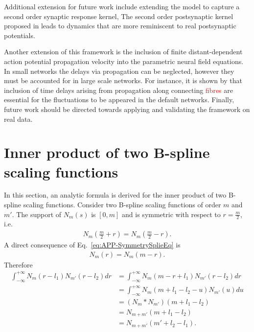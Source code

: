 \documentclass[review,authoryear,3p]{elsarticle}
\newcommand{\parham}[1]{\textcolor{red}{#1}}
\begin{document}
Additional extension for future work include extending the model to capture a second order synaptic response kernel, The second order postsynaptic kernel proposed in \citet{VanRotterdam1982} leads to dynamics that are more reminiscent to real postsynaptic potentials. 

Another extension of this framework is the inclusion of finite distant-dependent action potential propagation velocity into the parametric neural field equations. In small networks the delays via propagation can be neglected, however they must be accounted for in large scale networks. For instance, it is shown by \citet{Ghosh2008} that inclusion of time delays arising from propagation along connecting \parham{fibres} are essential for the fluctuations to be appeared in the default networks. Finally, future work should be directed towards applying and validating the framework on real data.

\appendix
\section{Inner product of two B-spline scaling functions}\label{ap:InnerProductOfBsplines}
In this section, an analytic formula is derived for the inner product of two B-spline scaling functions. Consider two B-spline scaling functions of order $m$ and $m'$. The support of $N_m\left(s\right)$ is $\left[ 0,m\right]$ and  is symmetric with respect to $r=\frac{m}{2}$, i.e.
\begin{align}\label{eq:APP-SymmetrySplieEq}
 N_{m}\left(\frac{m}{2}+r\right)=N_{m}\left(\frac{m}{2}-r\right).
\end{align}
A direct consequence of Eq.~\eqref{eq:APP-SymmetrySplieEq} is 
\begin{align}
 N_{m}\left(r\right)=N_{m}\left(m-r\right).
\end{align}
Therefore
\begin{align}
\int_{-\infty}^{+\infty}N_{m}\left(r-l_{1}\right)N_{m'}\left(r-l_{2}\right)dr&=\int_{-\infty}^{+\infty}N_{m}\left(m-r+l_{1}\right)N_{m'}\left(r-l_{2}\right)dr \nonumber \\
&=\int_{-\infty}^{+\infty}N_{m}\left(m+l_{1}-l_{2}-u\right)N_{m'}\left(u\right)du \nonumber \\
&=\left(N_m \ast N_{m'}\right) \left(m+l_{1}-l_{2}\right) \nonumber \\
&=N_{m+m'}\left(m+l_{1}-l_{2}\right) \nonumber \\
&=N_{m+m'}\left(m'+l_{2}-l_{1}\right).
\end{align}
\end{document}
